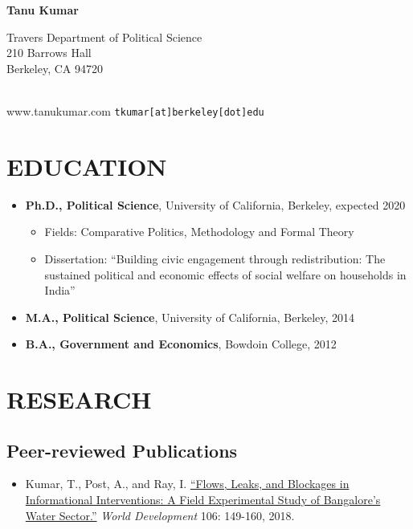 \documentclass[11pt]{article}
\begin{document}
\thispagestyle{empty}
\begin{center}
\textbf{\Huge{Tanu Kumar}}
\end{center}

\begin{minipage}[t]{0.5\textwidth}
Travers Department of Political Science\\
210 Barrows Hall\\
Berkeley, CA 94720\\ \\
\end{minipage}
\begin{minipage}[t]{0.5\textwidth}
\begin{flushright}
www.tanukumar.com
\texttt{tkumar[at]berkeley[dot]edu}
\end{flushright}\end{minipage}
\section*{EDUCATION}

	\begin{itemize}[nosep]
		\item[] \textbf{Ph.D., Political Science}, University of California, Berkeley, expected 2020
		\begin{itemize}[nosep]
	\item[] Fields: Comparative Politics, Methodology and Formal Theory
	\item[] Dissertation: ``Building civic engagement through redistribution: The sustained political and economic effects of social welfare on households in India''
\end{itemize}
	\item[]  \textbf{M.A., Political Science}, University of California, Berkeley, 2014
	\item[] \textbf{B.A., Government and Economics}, Bowdoin College, 2012

\end{itemize}	
\vspace{3mm}
\section*{RESEARCH}

\subsection*{Peer-reviewed Publications}
\begin{itemize}
		\item[] Kumar, T., Post, A., and Ray, I. \href{https://www.sciencedirect.com/science/article/pii/S0305750X18300329}{``Flows, Leaks, and Blockages in Informational Interventions: A Field Experimental Study of Bangalore's Water Sector.''} \textit{World Development} 106: 149-160, 2018.
\end{itemize}
\end{document}
